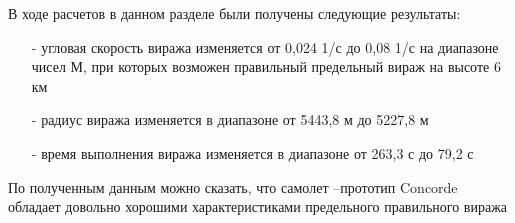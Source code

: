 В ходе расчетов в данном разделе были получены следующие результаты:
\begin{itemize}
    \item [-] угловая скорость виража изменяется от 0,024 1/с до 0,08 1/с на диапазоне
чисел М, при которых возможен правильный предельный вираж на высоте 6 км
    \item [-] радиус виража изменяется в диапазоне от 5443,8 м до 5227,8 м
    \item [-] время выполнения виража изменяется в диапазоне от 263,3 с до 79,2 с
\end{itemize}
По полученным данным можно сказать, что самолет –прототип Concorde обладает
довольно хорошими характеристиками предельного правильного виража





